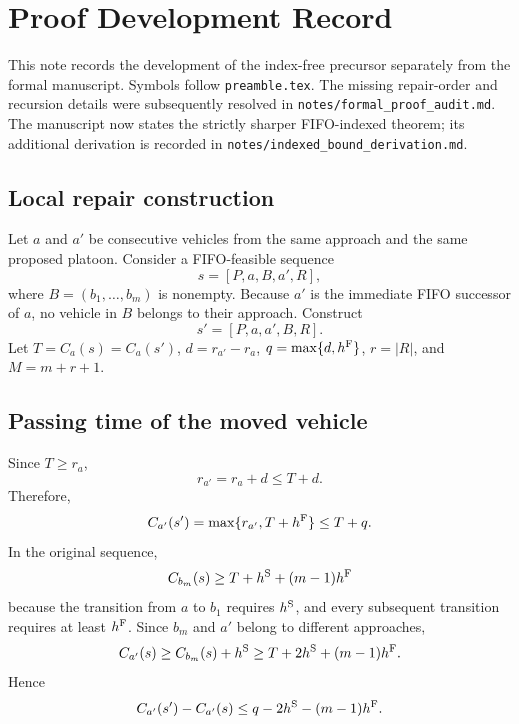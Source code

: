 \section*{Proof Development Record}

This note records the development of the index-free precursor separately from the formal manuscript. Symbols follow \texttt{preamble.tex}. The missing repair-order and recursion details were subsequently resolved in \texttt{notes/formal\_proof\_audit.md}. The manuscript now states the strictly sharper FIFO-indexed theorem; its additional derivation is recorded in \texttt{notes/indexed\_bound\_derivation.md}.

\subsection*{Local repair construction}

Let \(a\) and \(a'\) be consecutive vehicles from the same approach and the same proposed platoon. Consider a FIFO-feasible sequence
\begin{equation}
s=[P,a,B,a',R],
\end{equation}
where \(B=(b_1,\ldots,b_m)\) is nonempty. Because \(a'\) is the immediate FIFO successor of \(a\), no vehicle in \(B\) belongs to their approach. Construct
\begin{equation}
s'=[P,a,a',B,R].
\end{equation}
Let \(T=C_a(s)=C_a(s')\), \(d=r_{a'}-r_a\), \(q=\max\{d,h^{\mathrm{F}}\}\), \(r=|R|\), and \(M=m+r+1\).

\subsection*{Passing time of the moved vehicle}

Since \(T\ge r_a\),
\begin{equation}
r_{a'}=r_a+d\le T+d.
\end{equation}
Therefore,
\begin{equation}
C_{a'}(s')=\max\{r_{a'},T+h^{\mathrm{F}}\}\le T+q.
\end{equation}
In the original sequence,
\begin{equation}
C_{b_m}(s)\ge T+h^{\mathrm{S}}+(m-1)h^{\mathrm{F}}
\end{equation}
because the transition from \(a\) to \(b_1\) requires \(h^{\mathrm{S}}\), and every subsequent transition requires at least \(h^{\mathrm{F}}\). Since \(b_m\) and \(a'\) belong to different approaches,
\begin{equation}
C_{a'}(s)\ge C_{b_m}(s)+h^{\mathrm{S}}
\ge T+2h^{\mathrm{S}}+(m-1)h^{\mathrm{F}}.
\end{equation}
Hence
\begin{equation}
C_{a'}(s')-C_{a'}(s)
\le q-2h^{\mathrm{S}}-(m-1)h^{\mathrm{F}}.
\label{eq:note-moved-change}
\end{equation}

